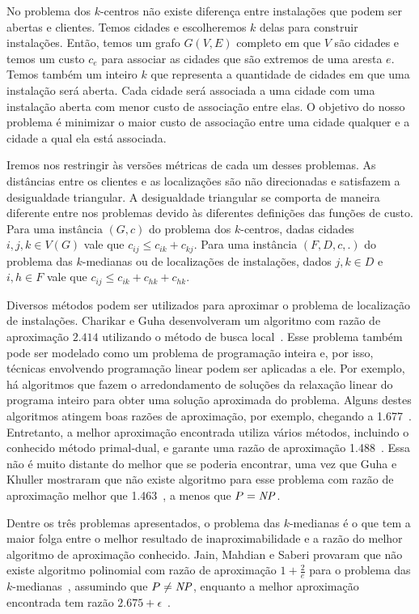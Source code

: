 \documentclass[12pt]{article}
\begin{document}
No problema dos $k$-centros não existe diferença entre instalações que podem ser abertas e clientes. Temos cidades e escolheremos $k$ delas para construir instalações.
Então, temos um grafo $G(V,E)$ completo em que $V$ são cidades e temos um custo $c_{e}$ para associar as cidades que são extremos de uma aresta $e$. Temos também um inteiro $k$ que representa a quantidade de cidades em que uma instalação será aberta. Cada cidade será associada a uma cidade com uma instalação aberta com menor custo de associação entre elas. O objetivo do nosso problema é minimizar o maior custo de associação entre uma cidade qualquer e a cidade a qual ela está associada.

Iremos nos restringir às versões métricas de cada um desses problemas. As distâncias entre os clientes e as localizações são não direcionadas e satisfazem a desigualdade triangular. A desigualdade triangular se comporta de maneira diferente entre nos problemas devido às diferentes definições das funções de custo. Para uma instância $(G,c)$ do problema dos $k$-centros, dadas cidades $i,j,k \in V(G)$ vale que $ c_{ij} \leq c_{ik} + c_{kj}$. Para uma instância $(F,D,c,.)$ do problema das $k$-medianas ou de localizações de instalações, dados $j,k \in D$ e $i,h \in F$ vale que $c_{ij} \leq c_{ik} + c_{hk} + c_{hk}$.

Diversos métodos podem ser utilizados para aproximar o problema de localização de instalações. Charikar e Guha desenvolveram um algoritmo com razão de aproximação $2.414$ utilizando o método de busca local~\cite{Charikar&Guha'05}.  Esse problema também pode ser modelado como um problema de programação inteira e, por isso, técnicas envolvendo programação linear podem ser aplicadas a ele.  Por exemplo, há algoritmos que fazem o arredondamento de soluções da relaxação linear do programa inteiro para obter uma solução aproximada do problema.  Alguns destes algoritmos atingem boas razões de aproximação, por exemplo, chegando a 1.677~\cite{Byrka&Aardal'10}. Entretanto, a melhor aproximação encontrada utiliza vários métodos, incluindo o conhecido método primal-dual, e garante uma razão de aproximação 1.488~\cite{LI'13}. Essa não é muito distante do melhor que se poderia encontrar, uma vez que Guha e Khuller mostraram que não existe algoritmo para esse problema com razão de aproximação melhor que 1.463~\cite{GUHA1999228}, a menos que $P = \mathit{NP}$.


Dentre os três problemas apresentados, o problema das $k$-medianas é o que tem a maior folga entre o melhor resultado de inaproximabilidade e a razão do melhor algoritmo de aproximação conhecido. Jain, Mahdian e Saberi provaram que não existe algoritmo polinomial com razão de aproximação $1+ \frac{2}{e}$ para o problema das $k$-medianas~\cite{JMS'02}, assumindo que $P \neq \mathit{NP}$, enquanto a melhor aproximação encontrada tem razão $2.675 + \epsilon$~\cite{BPRST'17}.
\end{document}
